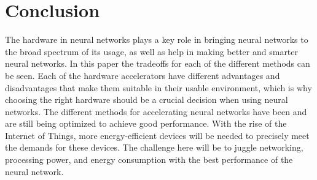 \documentclass[conference]{IEEEtran}
\begin{document}
	\section{Conclusion}
	The hardware in neural networks plays a key role in bringing neural networks to the broad spectrum of its usage, as well as help in making better and smarter neural networks. In this paper the tradeoffs for each of the different methods can be seen. Each of the hardware accelerators have different advantages and disadvantages that make them suitable in their usable environment, which is why choosing the right hardware should be a crucial decision when using neural networks. The different methods for accelerating neural networks have been and are still being optimized to achieve good performance. With the rise of the Internet of Things, more energy-efficient devices will be needed to precisely meet the demands for these devices. The challenge here will be to juggle networking, processing power, and energy consumption with the best performance of the neural network.
	\newpage
	
\end{document}

